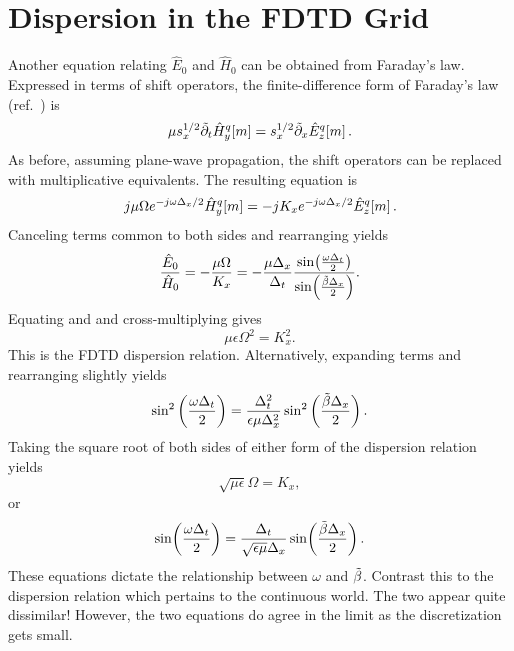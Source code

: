 \section{Dispersion in the FDTD Grid \label{sec:gridDispersion}}

Another equation relating $\hat{E}_0$ and $\hat{H}_0$ can be obtained
from Faraday's law.  Expressed in terms of shift operators, the
finite-difference form of Faraday's law
(ref.\ ) is
\begin{equation}
  \mu s_x^{1/2}\tpartial_t\fdtd{\hat{H}_y}{m}{q} =
  s_x^{1/2}\tpartial_x\fdtd{\hat{E}_z}{m}{q}.  
  \label{eq:faradayShift}
\end{equation}
As before, assuming plane-wave propagation, the shift operators can be
replaced with multiplicative equivalents.  The resulting equation is
\begin{equation}
  j\mu \Omega e^{-j\omega\Delx/2}
   \fdtd{\hat{H}_y}{m}{q}
  =
   -j K_x e^{-j\omega\Delx/2}
   \fdtd{\hat{E}_z}{m}{q}.
\end{equation}
Canceling terms common to both sides and rearranging yields
\begin{equation}
  \frac{\hat{E}_0}{\hat{H}_0} = 
  -\frac{\mu\Omega}{K_x}
  =
  -\frac{\mu\Delx}{\Delt}
  \frac{\sin\!\left(\frac{\omega\Delt}{2}\right)}
       {\sin\!\left(\frac{\tbeta\Delx}{2}\right)}.
  \label{eq:dispFaradayPart}
\end{equation}
Equating  and  and
cross-multiplying gives
\begin{equation}
  \mu\epsilon\Omega^2 = K_x^2.
  \label{eq:fdtdDispersionOneD}
\end{equation}
This is the FDTD dispersion relation.  Alternatively, expanding terms
and rearranging slightly yields
\begin{equation}
  \sin^2\left(\frac{\omega\Delt}{2}\right) =
  \frac{\Delt^2}{\epsilon\mu\Delx^2}
  \sin^2\left(\frac{\tbeta\Delx}{2}\right).
\end{equation}
Taking the square root of both sides of either form of the dispersion
relation yields
\begin{equation}
  \sqrt{\mu\epsilon}\Omega = K_x,
  \label{eq:disp1DOmegaK}
\end{equation}
or
\begin{equation}
  \sin\!\left(\frac{\omega\Delt}{2}\right) =
  \frac{\Delt}{\sqrt{\epsilon\mu}\Delx}
  \sin\!\left(\frac{\tbeta\Delx}{2}\right).
  \label{eq:disp1D}
\end{equation}
These equations dictate the relationship between $\omega$ and
$\tbeta$.  Contrast this to the dispersion relation
 which pertains to the continuous world.  The
two appear quite dissimilar!  However, the two equations do agree in
the limit as the discretization gets small.

